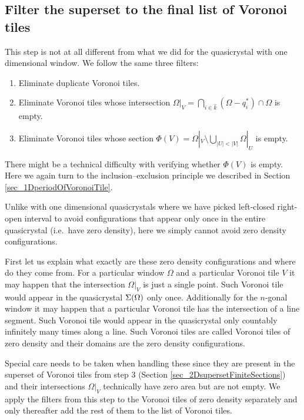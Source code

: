 \documentclass[text.tex]{subfiles}
\begin{document}
\subsection{Filter the superset to the final list of Voronoi tiles}
This step is not at all different from what we did for the quasicrystal with one dimensional window. We follow the same three filters: 
\begin{enumerate}
\item Eliminate duplicate Voronoi tiles. 
\item Eliminate Voronoi tiles whose intersection $\Omega|_{V} = \bigcap\limits_{i\in\hat{k}}(\Omega-q_i^\ast)\cap\Omega$ is empty. 
\item Eliminate Voronoi tiles whose section $\Phi(V) = \Omega|_{V}\setminus\bigcup_{|U|<|V|}\Omega|_{U}$ is empty. 
\end{enumerate}

There might be a technical difficulty with verifying whether $\Phi(V)$ is empty. Here we again turn to the inclusion--exclusion principle we described in Section \ref{sec_1DperiodOfVoronoiTile}. 

Unlike with one dimensional quasicrystals where we have picked left-closed right-open interval to avoid configurations that appear only once in the entire quasicrystal (i.e.\ have zero density), here we simply cannot avoid zero density configurations. 

First let us explain what exactly are these zero density configurations and where do they come from. For a particular window $\Omega$ and a particular Voronoi tile $V$ it may happen that the intersection $\Omega|_V$ is just a single point. Such Voronoi tile would appear in the quasicrystal $\Sigma(\Omega)$ only once. Additionally for the $n$-gonal window it may happen that a particular Voronoi tile has the intersection of a line segment. Such Voronoi tile would appear in the quasicrystal only countably infinitely many times along a line. Such Voronoi tiles are called Voronoi tiles of zero density and their domains are the zero density configurations. 

Special care needs to be taken when handling these since they are present in the superset of Voronoi tiles from step 3 (Section \ref{sec_2DsupersetFiniteSections}) and their intersections $\Omega|_V$ technically have zero area but are not empty. We apply the filters from this step to the Voronoi tiles of zero density separately and only thereafter add the rest of them to the list of Voronoi tiles. 
\end{document}
